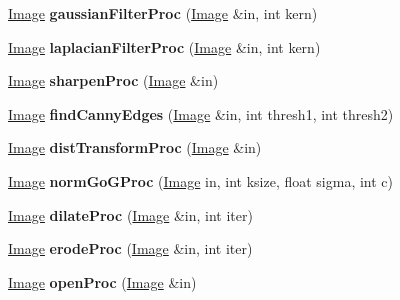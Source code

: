 \begin{DoxyCompactItemize}
\item 
\hyperlink{classImage}{Image} {\bfseries gaussian\+Filter\+Proc} (\hyperlink{classImage}{Image} \&in, int kern)\hypertarget{classMorphOps_af6cdc8e855e01fffdd878ce8e1728c78}{}\label{classMorphOps_af6cdc8e855e01fffdd878ce8e1728c78}

\item 
\hyperlink{classImage}{Image} {\bfseries laplacian\+Filter\+Proc} (\hyperlink{classImage}{Image} \&in, int kern)\hypertarget{classMorphOps_a86aa16737196420ba30e29acb9225ace}{}\label{classMorphOps_a86aa16737196420ba30e29acb9225ace}

\item 
\hyperlink{classImage}{Image} {\bfseries sharpen\+Proc} (\hyperlink{classImage}{Image} \&in)\hypertarget{classMorphOps_a5dc563f2d6b90340275ac68a7719182c}{}\label{classMorphOps_a5dc563f2d6b90340275ac68a7719182c}

\item 
\hyperlink{classImage}{Image} {\bfseries find\+Canny\+Edges} (\hyperlink{classImage}{Image} \&in, int thresh1, int thresh2)\hypertarget{classMorphOps_ac4618978f3e7b6fd8535c2f84e880a08}{}\label{classMorphOps_ac4618978f3e7b6fd8535c2f84e880a08}

\item 
\hyperlink{classImage}{Image} {\bfseries dist\+Transform\+Proc} (\hyperlink{classImage}{Image} \&in)\hypertarget{classMorphOps_ae8e8726798045784f44676d5b6635182}{}\label{classMorphOps_ae8e8726798045784f44676d5b6635182}

\item 
\hyperlink{classImage}{Image} {\bfseries norm\+Go\+G\+Proc} (\hyperlink{classImage}{Image} in, int ksize, float sigma, int c)\hypertarget{classMorphOps_ab3bc60547764643733b21cfe1c873725}{}\label{classMorphOps_ab3bc60547764643733b21cfe1c873725}

\item 
\hyperlink{classImage}{Image} {\bfseries dilate\+Proc} (\hyperlink{classImage}{Image} \&in, int iter)\hypertarget{classMorphOps_aefa28b4e640acee86331894ec46923f8}{}\label{classMorphOps_aefa28b4e640acee86331894ec46923f8}

\item 
\hyperlink{classImage}{Image} {\bfseries erode\+Proc} (\hyperlink{classImage}{Image} \&in, int iter)\hypertarget{classMorphOps_a856e2bce7c779f3f7eb98c53e5944724}{}\label{classMorphOps_a856e2bce7c779f3f7eb98c53e5944724}

\item 
\hyperlink{classImage}{Image} {\bfseries open\+Proc} (\hyperlink{classImage}{Image} \&in)\hypertarget{classMorphOps_a01ece2ee35bff1e72c79bf3ce44f4cee}{}\label{classMorphOps_a01ece2ee35bff1e72c79bf3ce44f4cee}


\end{DoxyCompactItemize}
